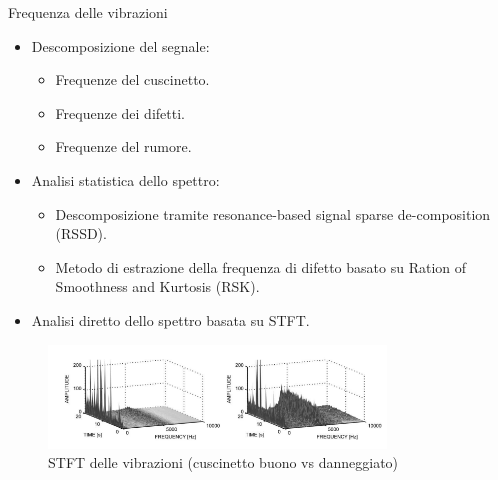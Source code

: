\documentclass{beamer}
\begin{document}
\begin{frame}[allowframebreaks]{Frequenza delle vibrazioni}
    \begin{itemize}
        \item Descomposizione del segnale\cite{tang2019fault}:
        \begin{itemize}
            \item Frequenze del cuscinetto.
            \item Frequenze dei difetti.
            \item Frequenze del rumore.
        \end{itemize}
        \item Analisi statistica dello spettro\cite{xue2022fault}:
        \begin{itemize}
            \item Descomposizione tramite resonance-based signal sparse de-composition (RSSD).
            \item Metodo di estrazione della frequenza di difetto basato su Ration of Smoothness and Kurtosis (RSK).
        \end{itemize}
        \framebreak
        \item Analisi diretto dello spettro basata su STFT\cite{rubio2012experimental}.
    \end{itemize}
    
    \begin{figure}
        \centering
        \includegraphics[width=0.8\textwidth]{Figures/STFT.png}
        \caption{STFT delle vibrazioni (cuscinetto buono vs danneggiato)}
        \label{fig:STFT}
    \end{figure}
\end{frame}
\end{document}
